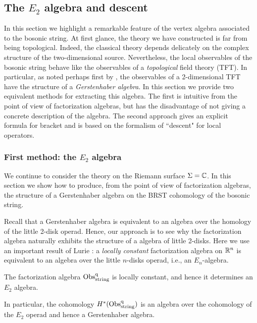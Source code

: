 \subsection{The $E_2$ algebra and descent}

In this section we highlight a remarkable feature of the vertex algebra associated to the bosonic string. 
At first glance, the theory we have constructed is far from being topological.
Indeed, the classical theory depends delicately on the complex structure of the two-dimensional source. 
Nevertheless, the local observables of the bosonic string behave like the observables of a {\em topological} field theory (TFT). 
In particular, as noted perhaps first by \cite{Getzler}, the observables of a 2-dimensional TFT have the structure of a {\em Gerstenhaber algebra}.
In this section we provide two equivalent methods for extracting this algebra.
The first is intuitive from the point of view of factorization algebras, but has the disadvantage of not giving a concrete description of the algebra. 
The second approach gives an explicit formula for bracket and is based on the formalism of ``descent" for local operators. 

\subsubsection{First method: the $E_2$ algebra}

We continue to consider the theory on the Riemann surface $\Sigma = \mathbb C$. 
In this section we show how to produce, from the point of view of factorization algebras, the structure of a Gerstenhaber algebra on the BRST cohomology of the bosonic string. 

Recall that a Gerstenhaber algebra is equivalent to an algebra over the homology of the little 2-disk operad.
Hence, our approach is to see why the factorization algebra naturally exhibits the structure of a algebra of little 2-disks.
Here we use an important result of Lurie \cite{Lurie}: 
a {\em locally constant} factorization algebra on $\mathbb R^n$ is equivalent to an algebra over the little $n$-disks operad, i.e., an $E_n$-algebra. 

\begin{prop} 
The factorization algebra ${\rm Obs}^{\rm q}_{\rm string}$ is locally constant, 
and hence it determines an $E_2$ algebra.
\end{prop}

In particular, the cohomology $H^*({\rm Obs}^{\rm q}_{\rm string})$ is an algebra over the cohomology of the $E_2$ operad and hence a Gerstenhaber algebra.

